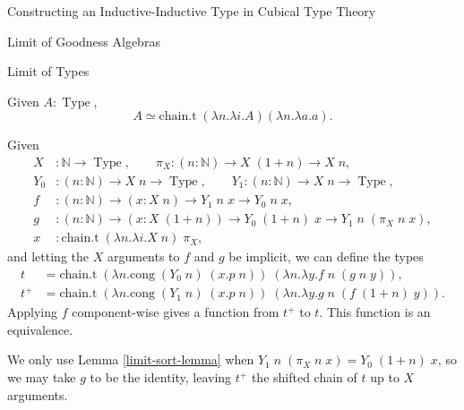 \documentclass[runningheads]{llncs}
\newcommand{\erase}[1]{{}}
\DeclareMathOperator{\USet}{Type}
\DeclareMathOperator{\Ix}{Ix}
\newcommand{\N}{\mathbb{N}}
\newcommand{\bbO}{\mathbb{O}}
\newcommand{\join}{\texttt{ext}}
\newcommand{\inj}{\texttt{inj}}
\begin{document}
\begin{section}{Constructing an Inductive-Inductive Type in Cubical Type Theory}
\begin{subsection}{Limit of Goodness Algebras}
\begin{subsubsection}{Limit of Types}
{        \begin{lemma}
            Given $A : \USet$, \[A \simeq \text{chain.t}\;(\lambda n.\lambda i.A)(\lambda n.\lambda a.a).\]
        \end{lemma}
    }
    
    \begin{lemma}
        Given \begin{align*}
        X &: \N \to \USet,\qquad
        \pi_X : (n : \N) \to X\;(1+n) \to X\;n,\\
        Y_0 &: (n : \N) \to X\;n \to \USet,\qquad
        Y_1 : (n : \N) \to X\;n \to \USet,\\
        f &: (n : \N) \to (x : X\;n) \to Y_1\;n\;x \to Y_0\;n\;x,\\
        g &: (n : \N) \to (x : X\;(1+n)) \to Y_0\;(1+n)\;x \to Y_1\;n\;(\pi_X\;n\;x),\\
        x &: \text{chain.t}\;(\lambda n.\lambda i.X\;n)\;\pi_X,
        \end{align*}
        and letting the $X$ arguments to $f$ and $g$ be implicit,
        we can define the types \begin{align*}t &= \text{chain.t}\;(\lambda n.\text{cong}\;(Y_0\;n)\;(x.p\;n))\;(\lambda n.\lambda y.f\;n\;(g\;n\;y)),\\t^+ &= \text{chain.t}\;(\lambda n.\text{cong}\;(Y_1\;n)\;(x.p\;n))\;(\lambda n.\lambda y.g\;n\;(f\;(1+n)\;y)).\end{align*}
        Applying $f$ component-wise gives a function from $t^+$ to $t$.
        This function is an equivalence.
    \end{lemma}
    We only use Lemma \ref{limit-sort-lemma} when $Y_1\;n\;(\pi_X\;n\;x) = Y_0\;(1+n)\;x$, so we may take $g$ to be the identity, leaving $t^+$ the shifted chain of $t$ up to $X$ arguments.
    
\end{subsubsection}


\erase{
We will proceed clause by clause, through $(L.A, L.B, L.\eta, L.\join, L.\inj)$.

\begin{subsubsection}{Defining $L.A$}
First, we define \[\Ix_\simeq.A : \Ix A\; L \simeq \text{chain.t}\;(\lambda n.\lambda i.\Ix A\;(S^n\;\bbO))\;(\lambda n.(\delta^\pi\;(S^n\;\bbO)).A)\] witnessing that $\Ix A$ commutes with chains by using Lemma \ref{limit-const-commute} with $\top$, since $\Ix A\;\delta^G = \top$ independent of $\delta^G$, and $(\delta^\pi\;(S^n\;\bbO)).A$ is the identity function.


\end{subsubsection}}
\end{subsection}
\end{section}
\end{document}
